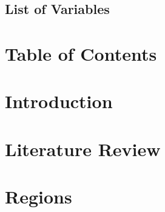 \documentclass[
	12pt, 
	]{article}
\numberwithin{equation}{section}
\theoremstyle{definition}
\theoremstyle{plain}
\theoremstyle{plain}
\theoremstyle{plain}
\begin{document}

\subsection*{List of Variables} %

\thispagestyle{empty}

\newpage


\section*{Table of Contents}

{
	\setlength{\parskip}{1pt}
	\singlespacing
	\tableofcontents
}

\thispagestyle{empty}

\newpage


\section{Introduction}\label{sec:introduction}





\section{Literature Review}\label{sec:literature-review}



\newpage




\newpage


\section{Regions}
\end{document}
